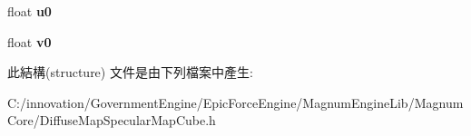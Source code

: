 \begin{DoxyCompactItemize}
\item 
float {\bfseries u0}\hypertarget{struct_i_dream_sky_1_1_diffuse_map_specular_map_cube_1_1_vertex_af315ed660fcde7b80cd713814a078b03}{}\label{struct_i_dream_sky_1_1_diffuse_map_specular_map_cube_1_1_vertex_af315ed660fcde7b80cd713814a078b03}

\item 
float {\bfseries v0}\hypertarget{struct_i_dream_sky_1_1_diffuse_map_specular_map_cube_1_1_vertex_a5c8c2f08af0bba259d15ad17d90536b0}{}\label{struct_i_dream_sky_1_1_diffuse_map_specular_map_cube_1_1_vertex_a5c8c2f08af0bba259d15ad17d90536b0}

\end{DoxyCompactItemize}


此結構(structure) 文件是由下列檔案中產生\+:\begin{DoxyCompactItemize}
\item 
C\+:/innovation/\+Government\+Engine/\+Epic\+Force\+Engine/\+Magnum\+Engine\+Lib/\+Magnum\+Core/Diffuse\+Map\+Specular\+Map\+Cube.\+h\end{DoxyCompactItemize}
